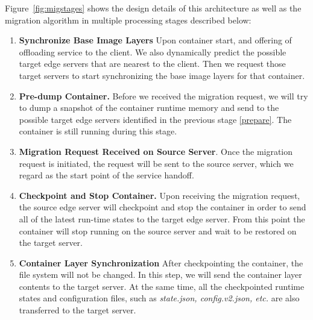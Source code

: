 


Figure~\ref{fig:migstages} shows the design details of this architecture as well as the migration algorithm in multiple processing stages described below:

\begin{enumerate}[label=\textbf{S\arabic*}]

\item \label{prepare} \textbf{%
Synchronize Base Image Layers} Upon container start, and offering of offloading service to the client. We also dynamically predict the possible target edge servers that are nearest to the client. Then we request those target servers to start synchronizing the base image layers for that container. 

\item \label{predump} \textbf{Pre-dump Container.} Before we received the migration request, we will try to dump a snapshot of the container runtime memory and send to the possible target edge servers identified in the previous stage \ref{prepare}. The container is still running during this stage. %

\item \label{request}\textbf{Migration Request Received on Source Server}. Once the migration request is initiated, the request will be sent to the source server, which we regard as the start point of the service handoff.


\item \label{checkpoint} \textbf{Checkpoint and Stop Container.} Upon receiving the migration request, the source edge server will checkpoint and stop the container in order to send all of the latest run-time states to the target edge server.
From this point the container will stop running on the source server and wait to be restored on the target server.

\item \label{fs-sync} \textbf{Container Layer Synchronization} After checkpointing the container, the file system will not be changed. In this step, we will send the container layer contents to the target server. At the same time, all the checkpointed runtime states and configuration files, such as \textit{state.json, config.v2.json, etc.} are also transferred to the target server. 


\end{enumerate}
